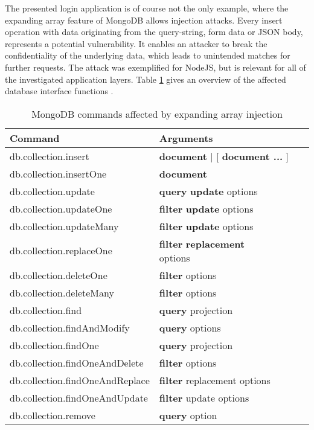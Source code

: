 The presented login application is of course not the only example, where the expanding array feature of MongoDB allows injection attacks. Every insert operation with data originating from the query-string, form data or JSON body, represents a potential vulnerability. It enables an attacker to break the confidentiality of the underlying data, which leads to unintended matches for further requests. The attack was exemplified for NodeJS, but is relevant for all of the investigated application layers. Table \ref{tab:mongo_commands_affected_expanding_array} gives an overview of the affected database interface functions \cite{MongoDB_CollFunc.2016}.\\

\begin{table}[h]
 \sffamily
 \centering
 \begin{tabular}{lllll}
  \textbf{Command} & \textbf{Arguments} \\ \hline
  db.collection.insert            & \multicolumn{3}{l}{\textcolor{dark-red}{\textbf{document}} | [ \textcolor{dark-red}{\textbf{document ... }} ] } \\
  db.collection.insertOne         & \textcolor{dark-red}{\textbf{document}} \\ 
  db.collection.update            & \textcolor{dark-blue}{\textbf{query}} \textcolor{dark-red}{\textbf{update}} options \\
  db.collection.updateOne         & \textcolor{dark-blue}{\textbf{filter}} \textcolor{dark-red}{\textbf{update}} options \\
  db.collection.updateMany        & \textcolor{dark-blue}{\textbf{filter}} \textcolor{dark-red}{\textbf{update}} options \\
  db.collection.replaceOne        & \textcolor{dark-blue}{\textbf{filter}} \textcolor{dark-red}{\textbf{replacement}} options \\\hdashline
  db.collection.deleteOne         & \textcolor{dark-blue}{\textbf{filter}} options \\
  db.collection.deleteMany        & \textcolor{dark-blue}{\textbf{filter}} options \\
  db.collection.find              & \textcolor{dark-blue}{\textbf{query}} projection \\
  db.collection.findAndModify     & \textcolor{dark-blue}{\textbf{query}} options \\
  db.collection.findOne           & \textcolor{dark-blue}{\textbf{query}} projection \\
  db.collection.findOneAndDelete  & \textcolor{dark-blue}{\textbf{filter}} options \\
  db.collection.findOneAndReplace & \textcolor{dark-blue}{\textbf{filter}} replacement options \\
  db.collection.findOneAndUpdate  & \textcolor{dark-blue}{\textbf{filter}} update options \\
  db.collection.remove            & \textcolor{dark-blue}{\textbf{query}}  option \\
  \bottomrule 
 \end{tabular}
 \caption{MongoDB commands affected by expanding array injection}
 \label{tab:mongo_commands_affected_expanding_array}
\end{table}

